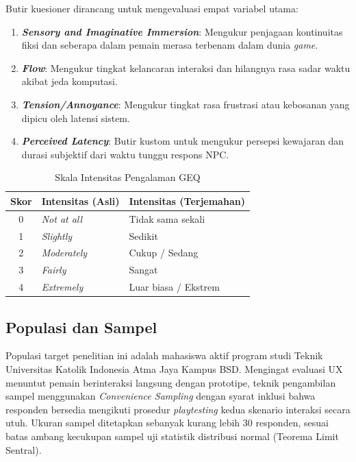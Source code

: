 Butir kuesioner dirancang untuk mengevaluasi empat variabel utama:
\begin{enumerate}
    \item \textbf{\textit{Sensory and Imaginative Immersion}}: Mengukur penjagaan kontinuitas fiksi dan seberapa dalam pemain merasa terbenam dalam dunia \textit{game}.
    \item \textbf{\textit{Flow}}: Mengukur tingkat kelancaran interaksi dan hilangnya rasa sadar waktu akibat jeda komputasi.
    \item \textbf{\textit{Tension/Annoyance}}: Mengukur tingkat rasa frustrasi atau kebosanan yang dipicu oleh latensi sistem.
    \item \textbf{\textit{Perceived Latency}}: Butir kustom untuk mengukur persepsi kewajaran dan durasi subjektif dari waktu tunggu respons NPC.
\end{enumerate}

\begin{table}[H]
    \centering
    \caption{Skala Intensitas Pengalaman GEQ \citep{ijsselsteijn2013game}}
    \label{tab:geqscale}
    \small
    \begin{tabular}{|c|l|l|}
        \hline
        \textbf{Skor} & \textbf{Intensitas (Asli)} & \textbf{Intensitas (Terjemahan)} \\ \hline
        0 & \textit{Not at all} & Tidak sama sekali \\ \hline
        1 & \textit{Slightly}   & Sedikit \\ \hline
        2 & \textit{Moderately} & Cukup / Sedang \\ \hline
        3 & \textit{Fairly}     & Sangat \\ \hline
        4 & \textit{Extremely}  & Luar biasa / Ekstrem \\ \hline
    \end{tabular}
\end{table}

\subsection{Populasi dan Sampel}
Populasi target penelitian ini adalah mahasiswa aktif program studi Teknik Universitas Katolik Indonesia Atma Jaya Kampus BSD. Mengingat evaluasi UX menuntut pemain berinteraksi langsung dengan prototipe, teknik pengambilan sampel menggunakan \textit{Convenience Sampling} dengan syarat inklusi bahwa responden bersedia mengikuti prosedur \textit{playtesting} kedua skenario interaksi secara utuh. Ukuran sampel ditetapkan sebanyak kurang lebih 30 responden, sesuai batas ambang kecukupan sampel uji statistik distribusi normal (Teorema Limit Sentral).


